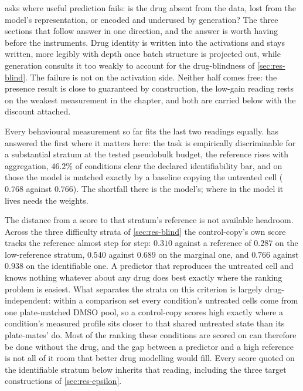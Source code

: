 \noindent
{} asks where useful prediction fails: is the drug absent from
the data, lost from the model's representation, or encoded and underused by
generation? The three sections that follow answer in one direction, and the
answer is worth having before the instruments. Drug identity is written into the
activations and stays written, more legibly with depth once batch structure is
projected out, while generation consults it too weakly to account for the
drug-blindness of \cref{sec:res-blind}. The failure is not on the activation
side. Neither half comes free: the presence result is close to guaranteed by
construction, the low-gain reading rests on the weakest measurement in the
chapter, and both are carried below with the discount attached.

Every behavioural measurement so far fits the last two readings
equally.
 has answered the first where it matters here: the task is
empirically discriminable for a substantial stratum at the tested pseudobulk
budget, the reference rises with aggregation, $46.2\%$ of conditions clear the
declared identifiability bar, and on those the model is matched exactly by a
baseline copying the untreated cell ($0.768$ against $0.766$). The shortfall there is the model's; where in the model it lives needs the
weights.

\begin{scopelimit}
The distance from a score to that stratum's reference is not available headroom.
Across the three difficulty strata of \cref{sec:res-blind} the control-copy's own
score tracks the reference almost step for step: $0.310$ against a reference of
$0.287$ on the low-reference stratum, $0.540$ against $0.689$ on the marginal one,
and $0.766$ against $0.938$ on the identifiable one. A predictor that reproduces
the untreated cell and knows nothing whatever about any drug does best exactly
where the ranking problem is easiest. What separates the strata on this
criterion is largely drug-independent: within a comparison set every condition's
untreated cells come from one plate-matched DMSO pool, so a control-copy scores
high exactly where a condition's measured profile sits closer to that shared
untreated state than its plate-mates' do. Most of the ranking these conditions
are scored on can therefore be done without the drug, and the gap between a predictor and a high reference is
not all of it room that better drug modelling would fill. Every score quoted on
the identifiable stratum below inherits that reading, including the three target
constructions of \cref{sec:res-epsilon}.
\end{scopelimit}

